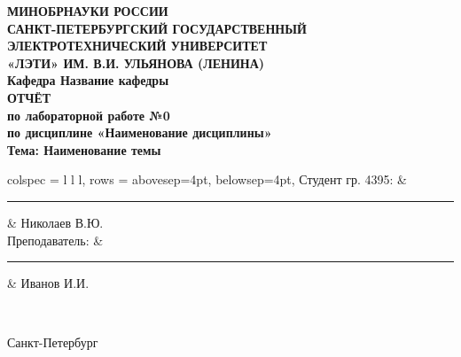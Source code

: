 \begin{titlepage}
	\large
	\begin{center}
		\textbf{МИНОБРНАУКИ РОССИИ}\\
		\textbf{САНКТ-ПЕТЕРБУРГСКИЙ ГОСУДАРСТВЕННЫЙ}\\
		\textbf{ЭЛЕКТРОТЕХНИЧЕСКИЙ УНИВЕРСИТЕТ}\\
		\textbf{«ЛЭТИ» ИМ. В.И. УЛЬЯНОВА (ЛЕНИНА)}\\
		\textbf{Кафедра Название кафедры}\\[4cm]

		\textbf{ОТЧЁТ}\\
		\textbf{по лабораторной работе №0}\\
		\textbf{по дисциплине «Наименование дисциплины»}\\
		\textbf{Тема: Наименование темы}\\
	\end{center}\vfill

	\begin{tblr}{
			colspec = {l l l},
			rows = {abovesep=4pt, belowsep=4pt},
		}
		Студент гр. 4395: & \hspace{1cm}\rule{5cm}{0.4pt} & Николаев В.Ю. \\
		Преподаватель:    & \hspace{1cm}\rule{5cm}{0.4pt} & Иванов И.И.   \\
	\end{tblr}\\[3cm]

	\begin{center}
		Санкт-Петербург\\
		\the\year
	\end{center}
\end{titlepage}